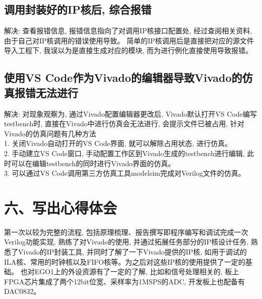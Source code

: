 \documentclass{article}
\newcommand{\fourhao}{\fontsize{14pt}{\baselineskip}\selectfont} %
\newcommand{\xiaosihao}{\fontsize{12pt}{\baselineskip}\selectfont} %
\begin{document}
\subsection*{调用封装好的IP核后, 综合报错}
解决: 查看报错信息, 报错信息指向了对调用IP核接口配置处, 经过查阅相关资料, 由于自己对IP核调用的错误使用导致。
简单的IP核调用后是直接把对应的源文件导入工程下, 我误以为是直接生成对应的模块, 而为进行例化直接使用导致报错。
\subsection*{使用VS Code作为Vivado的编辑器导致Vivado的仿真报错无法进行}
解决: 对现象观察为, 通过Vivado配置编辑器更改后, Vivado默认打开VS Code编写testbench时, 直接在Vivado中进行仿真会无法进行, 会提示文件已被占用, 
针对Vivado的仿真问题有几种方法\\
1. 关闭Vivado自动打开的VS Code界面, 就可以解除占用状态, 进行仿真。\\
2. 手动建立VS Code窗口, 手动配置工作区到Vivado生成的testbench进行编辑, 此时可以在编辑testbench的同时进行Vivado界面的仿真。\\
3. 可以通过VS Code调用第三方仿真工具modelsim完成对Verilog文件的仿真。\\
\section*{\fourhao 六、写出心得体会}
\xiaosihao
第一次以较为完整的流程, 包括原理梳理、报告撰写即程序编写和调试完成一次Verilog功能实现, 熟练了对Vivado的使用, 
并通过拓展任务部分的IP核设计任务, 熟悉了Vivado的IP封装工具, 并同时了解了一下Vivado提供的IP核, 如用于调试的ILA核、常用的时钟核以及FIFO核等。为之后对这些IP核的使用提供了一定的基础。
也对EGO1上的外设资源有了一定的了解, 比如和信号处理相关的, 板上FPGA芯片集成了两个12bit位宽、采样率为1MSPS的ADC, 开发板上也配备有DAC0832。\\
\end{document}
